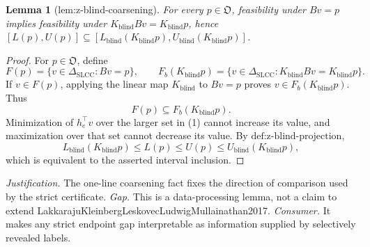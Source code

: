 \documentclass{article}
\newtheorem{lemma}{Lemma}
\begin{document}
\begin{lemma}[lem:z-blind-coarsening]\label{lem:z-blind-coarsening}
For every \(p\in\mathfrak O\), feasibility under \(Bv=p\) implies feasibility under \(K_{\mathrm{blind}}Bv=K_{\mathrm{blind}}p\), hence \([L(p),U(p)]\subseteq[L_{\mathrm{blind}}(K_{\mathrm{blind}}p),U_{\mathrm{blind}}(K_{\mathrm{blind}}p)]\).
\end{lemma}
\begin{proof}
For \(p\in\mathfrak O\), define
\[
F(p)=\{v\in\Delta_{\mathrm{SLCC}}:Bv=p\},
\qquad
F_b(K_{\mathrm{blind}}p)
=\{v\in\Delta_{\mathrm{SLCC}}:K_{\mathrm{blind}}Bv=K_{\mathrm{blind}}p\}.
\]
If \(v\in F(p)\), applying the linear map \(K_{\mathrm{blind}}\) to \(Bv=p\) proves \(v\in F_b(K_{\mathrm{blind}}p)\).  Thus
\[
F(p)\subseteq F_b(K_{\mathrm{blind}}p).
\tag{1}
\]
Minimization of \(h_e^{\top}v\) over the larger set in (1) cannot increase its value, and maximization over that set cannot decrease its value.  By \(\text{def:z-blind-projection}\),
\[
L_{\mathrm{blind}}(K_{\mathrm{blind}}p)\leq L(p)
\leq U(p)\leq U_{\mathrm{blind}}(K_{\mathrm{blind}}p),
\]
which is equivalent to the asserted interval inclusion.
\end{proof}
\par\smallskip\noindent \textit{Justification.} The one-line coarsening fact fixes the direction of comparison used by the strict certificate. \textit{Gap.} This is a data-processing lemma, not a claim to extend LakkarajuKleinbergLeskovecLudwigMullainathan2017. \textit{Consumer.} It makes any strict endpoint gap interpretable as information supplied by selectively revealed labels.
\end{document}
